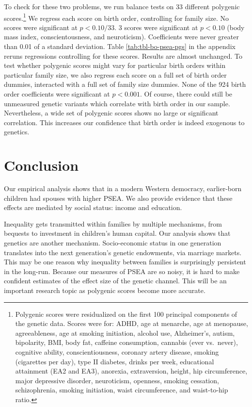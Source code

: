 \documentclass[
]{article}
\begin{document}
To check for these two problems, we run balance tests on 33 different
polygenic scores.\footnote{Polygenic scores were residualized on the first 100 principal
  components of the genetic data. Scores were for: ADHD, age at
  menarche, age at menopause, agreeableness, age at smoking
  initiation, alcohol use, Alzheimer's, autism, bipolarity, BMI, body
  fat, caffeine consumption, cannabis (ever vs.~never), cognitive
  ability, conscientiousness, coronary artery disease, smoking
  (cigarettes per day), type II diabetes, drinks per week, educational
  attainment (EA2 and EA3), anorexia, extraversion, height, hip
  circumference, major depressive disorder, neuroticism, openness,
  smoking cessation, schizophrenia, smoking initiation, waist
  circumference, and waist-to-hip ratio.} We regress each score on birth order, controlling
for family size. No scores were significant at \(p < 0.10/33\). 3
scores were significant at \(p < 0.10\) (body mass index,
conscientousness, and neuroticism). Coefficients were never greater than
0.01 of a standard deviation. Table \ref{tab:tbl-bo-psea-pgs} in the
appendix reruns regressions controlling for these scores. Results are
almost unchanged. To test whether polygenic scores might vary for
particular birth orders within particular family size, we also regress
each score on a full set of birth order dummies, interacted with a full
set of family size dummies. None of the 924 birth order
coefficients were significant at \(p < 0.001\). Of course, there could
still be unmeasured genetic variants which correlate with birth order in
our sample. Nevertheless, a wide set of polygenic scores shows no large
or significant correlation. This increases our confidence that birth
order is indeed exogenous to genetics.

\hypertarget{conclusion}{%
\section{Conclusion}\label{conclusion}}

Our empirical analysis shows that in a modern Western democracy,
earlier-born children had spouses with higher PSEA. We also provide
evidence that these effects are mediated by social status: income and
education.

Inequality gets transmitted within families by multiple mechanisms, from
bequests to investment in children's human capital. Our analysis shows
that genetics are another mechanism. Socio-economic status in one
generation translates into the next generation's genetic endowments, via
marriage markets. This may be one reason why inequality between families
is surprisingly persistent in the long-run. Because our measures of PSEA
are so noisy, it is hard to make confident estimates of the effect size
of the genetic channel. This will be an important research topic as
polygenic scores become more accurate.
\end{document}
